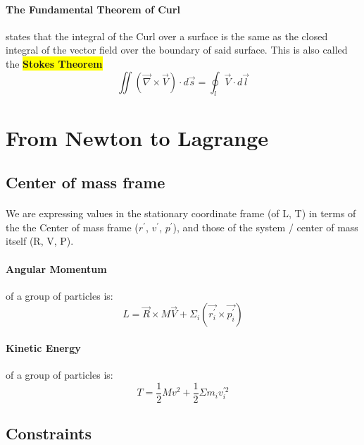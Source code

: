\paragraph{The Fundamental Theorem of Curl} states that the integral of the Curl over a surface is the same as the closed integral of the vector field over the boundary of said surface.  This is also called the \colorbox{yellow}{\textbf{Stokes Theorem}}
\begin{equation} \iint (\vec{\nabla} \times \vec{V}) \cdot d\vec{s} = \oint_{l} \vec{V} \cdot d \vec{l} \end{equation}



\section{From Newton to Lagrange}


\subsection{Center of mass frame}

\paragraph{}
We are expressing values in the stationary coordinate frame (of L, T) in terms of the the Center of mass frame ($r^\prime$, $v^\prime$, $p^\prime$), and those of the system / center of mass itself (R, V, P).

\paragraph{Angular Momentum} of a group of particles is:
\begin{equation}
    L = \vec{R} \times M \vec{V} + \Sigma_i (\vec{r_i^\prime} \times \vec{p_i^\prime})
\end{equation}
\paragraph{Kinetic Energy} of a group of particles is:
\begin{equation}
    T = \frac{1}{2}Mv^2 + \frac{1}{2} \Sigma m_{i}v_{i}^{\prime 2}
\end{equation}


\subsection{Constraints}

